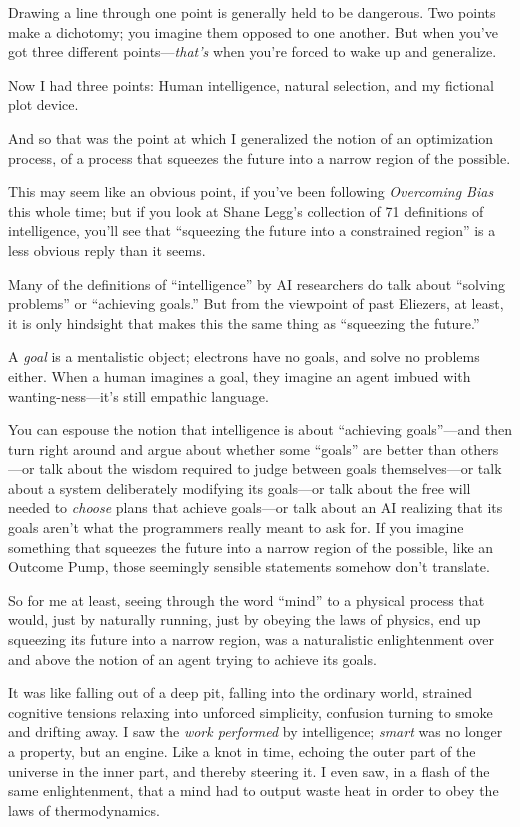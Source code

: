 {
 Drawing a line through one point is generally held to be
dangerous. Two points make a dichotomy; you imagine them opposed to one
another. But when you've got three different
points---\textit{that's} when you're
forced to wake up and generalize.}

{
 Now I had three points: Human intelligence, natural selection, and
my fictional plot device.}

{
 And so that was the point at which I generalized the notion of an
optimization process, of a process that squeezes the future into a
narrow region of the possible.}

{
 This may seem like an obvious point, if you've
been following \textit{Overcoming Bias} this whole time; but if you
look at Shane Legg's collection of 71 definitions of
intelligence, you'll see that
``squeezing the future into a constrained
region'' is a less obvious reply than it seems.}

{
 Many of the definitions of
``intelligence'' by AI researchers
do talk about ``solving problems''
or ``achieving goals.'' But from the
viewpoint of past Eliezers, at least, it is only hindsight that makes
this the same thing as ``squeezing the
future.''}

{
 A \textit{goal} is a mentalistic object; electrons have no goals,
and solve no problems either. When a human imagines a goal, they
imagine an agent imbued with wanting-ness---it's still
empathic language.}

{
 You can espouse the notion that intelligence is about
``achieving goals''---and then turn
right around and argue about whether some
``goals'' are better than
others---or talk about the wisdom required to judge between goals
themselves---or talk about a system deliberately modifying its
goals---or talk about the free will needed to \textit{choose} plans
that achieve goals---or talk about an AI realizing that its goals
aren't what the programmers really meant to ask for. If
you imagine something that squeezes the future into a narrow region of
the possible, like an Outcome Pump, those seemingly sensible statements
somehow don't translate.}

{
 So for me at least, seeing through the word
``mind'' to a physical process that
would, just by naturally running, just by obeying the laws of physics,
end up squeezing its future into a narrow region, was a naturalistic
enlightenment over and above the notion of an agent trying to achieve
its goals.}

{
 It was like falling out of a deep pit, falling into the ordinary
world, strained cognitive tensions relaxing into unforced simplicity,
confusion turning to smoke and drifting away. I saw the \textit{work
performed} by intelligence; \textit{smart} was no longer a property,
but an engine. Like a knot in time, echoing the outer part of the
universe in the inner part, and thereby steering it. I even saw, in a
flash of the same enlightenment, that a mind had to output waste heat
in order to obey the laws of thermodynamics.}

